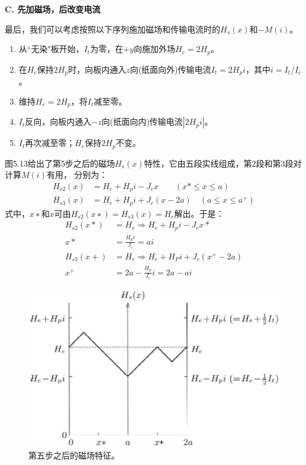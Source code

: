 \textbf{C. 先加磁场，后改变电流}

最后，我们可以考虑按照以下序列施加磁场和传输电流时的$H_s(x)$和$−M(i)$。

\begin{enumerate}
	\item 从``无染"板开始，$I_t$为零，在$+y$向施加外场$H_e=2H_p$。
	\item 在$H_e$保持$2H_p$时，向板内通入$z$向(纸面向外)传输电流$I_t=2H_p i$，其中$i=I_t/I_c$。
	\item 维持$H_e=2H_p$，将$I_t$减至零。
	\item $I_t$反向，向板内通入$-z$向(纸面向内)传输电流$|2H_p i|$。
	\item $I_t$再次减至零；$H_e$保持$2H_p$不变。
\end{enumerate}

图5.13给出了第5步之后的磁场$H_s(x)$特性，它由五段实线组成，第2段和第3段对计算$M(i)$有用，
分别为：
\begin{align*}
H_{s2}(x)&=H_{e}+H_{p}i-J_{c}x\qquad(x*\leq x\leq a)\\
H_{s3}(x)&=H_{e}+H_{p}i+J_{c}(x-2a)\quad(a\leq x\leq a^{+})
\end{align*}
式中，$x∗$和$x$可由$H_{s2}(x∗)=H_{s3}(x)=H_e$解出。于是：
\begin{align*}
H_{s2}(x*)&=H_{e}\Rightarrow H_{e}+H_{p}i-J_{c}x*\\
x*&=\frac{H_{p}i}{J_{c}}=ai\\
H_{s3}(x+)&=H_{e}\Rightarrow H_{e}+H_{P}i+J_{c}(x^{+}-2a)\\
x^{+}&=2a-\frac{H_{p}}{J_{c}}i=2a-ai
\end{align*}

\begin{figure}[htbp]
	\centering
	\includegraphics[scale=0.5]{chpt5/figs/fig5.13.eps}
	\caption{第五步之后的磁场特征。}
\end{figure}

